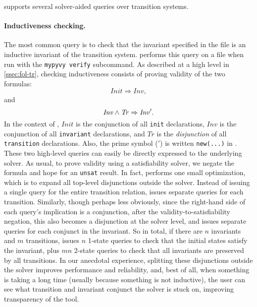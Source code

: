 \mypyvy supports several solver-aided queries over transition systems.

\paragraph{Inductiveness checking.}
The most common query is to check that
  the invariant specified in the file is an inductive invariant
  of the transition system.
\mypyvy performs this query on a file
  when run with the \texttt{mypyvy verify} subcommand.
As described at a high level in \cref{ssec:fol-tr},
  checking inductiveness consists of proving validity of the two formulas:
\[
  \mathit{Init} \Rightarrow \mathit{Inv},
\]
and
\[
  \mathit{Inv} \land \mathit{Tr} \Rightarrow \mathit{Inv}'.
\]
In the context of \mypyvy,
  $\mathit{Init}$ is the conjunction of all \lstinline[language=mypyvy]{init} declarations,
  $\mathit{Inv}$ is the conjunction of all \lstinline[language=mypyvy]{invariant} declarations, and
  $\mathit{Tr}$ is the \emph{disjunction} of all \lstinline[language=mypyvy]{transition} declarations.
Also, the prime symbol ($'$) is written \lstinline[language=mypyvy]{new(...)} in \mypyvy.
These two high-level queries can easily be directly expressed to the underlying solver.
As usual, to prove validity using a satisfiability solver,
  we negate the formula and hope for an \texttt{unsat} result.
In fact, \mypyvy performs one small optimization,
  which is to expand all top-level disjunctions outside the solver.
Instead of issuing a single query for the entire transition relation,
  \mypyvy issues separate queries for each transition.
Similarly, though perhaps less obviously,
  since the right-hand side of each query's implication is a conjunction,
  after the validity-to-satisfiability negation,
  this also becomes a disjunction at the solver level,
  and \mypyvy issues separate queries for each conjunct in the invariant.
So in total, if there are $n$ invariants and $m$ transitions,
  \mypyvy issues $n$ 1-state queries to check that the initial states satisfy the invariant,
  plus $mn$ 2-state queries to check that all invariants are preserved by all transitions.
In our anecdotal experience,
  splitting these disjunctions outside the solver improves performance and reliability,
  and, best of all, when something is taking a long time (usually because something is not inductive),
  the user can see what transition and invariant conjunct the solver is stuck on,
  improving transparency of the tool.


